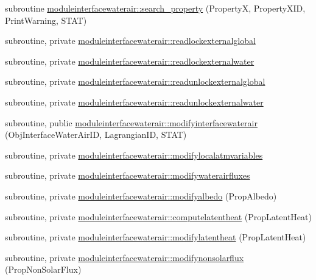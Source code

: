 \begin{DoxyCompactItemize}
\item 
subroutine \mbox{\hyperlink{namespacemoduleinterfacewaterair_abba77353f44ae39342d577e54d38ad95}{moduleinterfacewaterair\+::search\+\_\+property}} (PropertyX, Property\+X\+ID, Print\+Warning, S\+T\+AT)
\item 
subroutine, private \mbox{\hyperlink{namespacemoduleinterfacewaterair_a859b7054113f5f1ab347adbd693c2e16}{moduleinterfacewaterair\+::readlockexternalglobal}}
\item 
subroutine, private \mbox{\hyperlink{namespacemoduleinterfacewaterair_a78276c71fe608663c6c964c59c8c7626}{moduleinterfacewaterair\+::readlockexternalwater}}
\item 
subroutine, private \mbox{\hyperlink{namespacemoduleinterfacewaterair_ada112545191c798704451772d5803ea0}{moduleinterfacewaterair\+::readunlockexternalglobal}}
\item 
subroutine, private \mbox{\hyperlink{namespacemoduleinterfacewaterair_a380a0dfa2a33b7c2eef433d69fdf7fef}{moduleinterfacewaterair\+::readunlockexternalwater}}
\item 
subroutine, public \mbox{\hyperlink{namespacemoduleinterfacewaterair_ad372fa1a038ce383360d4422cc25923d}{moduleinterfacewaterair\+::modifyinterfacewaterair}} (Obj\+Interface\+Water\+Air\+ID, Lagrangian\+ID, S\+T\+AT)
\item 
subroutine, private \mbox{\hyperlink{namespacemoduleinterfacewaterair_a44a9529a1162816a090c836bc75d3f29}{moduleinterfacewaterair\+::modifylocalatmvariables}}
\item 
subroutine, private \mbox{\hyperlink{namespacemoduleinterfacewaterair_a91edae849454c0ec7ebcefd91556486e}{moduleinterfacewaterair\+::modifywaterairfluxes}}
\item 
subroutine, private \mbox{\hyperlink{namespacemoduleinterfacewaterair_ad58b286425c066f4643dc56d5a605645}{moduleinterfacewaterair\+::modifyalbedo}} (Prop\+Albedo)
\item 
subroutine, private \mbox{\hyperlink{namespacemoduleinterfacewaterair_a5442677ffd4780b9f170ffed821b8185}{moduleinterfacewaterair\+::computelatentheat}} (Prop\+Latent\+Heat)
\item 
subroutine, private \mbox{\hyperlink{namespacemoduleinterfacewaterair_a75fdc03352ad6627e770e22eddc20f05}{moduleinterfacewaterair\+::modifylatentheat}} (Prop\+Latent\+Heat)
\item 
subroutine, private \mbox{\hyperlink{namespacemoduleinterfacewaterair_a9ae768b301ebc2c73524836b992b568d}{moduleinterfacewaterair\+::modifynonsolarflux}} (Prop\+Non\+Solar\+Flux)

\end{DoxyCompactItemize}

